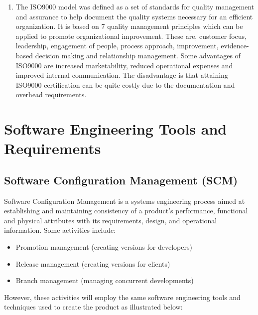 \documentclass{article}
\begin{document}
\begin{enumerate}
    \item The ISO9000 model was defined as a set of standards for quality management and assurance to help document the quality systems necessary for an efficient organization. It is based on 7 quality management principles which can be applied to promote organizational improvement. These are, customer focus, leadership, engagement of people, process approach, improvement, evidence-based decision making and relationship management. Some advantages of ISO9000 are increased marketability, reduced operational expenses and improved internal communication. The disadvantage is that attaining ISO9000 certification can be quite costly due to the documentation and overhead requirements.
   \end{enumerate}
   


\newpage
\section{Software Engineering Tools and Requirements}
\subsection{Software Configuration Management (SCM)}

    Software Configuration Management is a systems engineering process aimed at establishing and maintaining consistency of a product’s performance, functional and physical attributes with its requirements, design, and operational information.\cite{tenbest} Some activities include:
    \begin{itemize}
        \item Promotion management (creating versions for developers)
        \item Release management (creating versions for clients)
        \item Branch management (managing concurrent developments)
    \end{itemize}

    However, these activities will employ the same software engineering tools and techniques used to create the product as illustrated below:\newline
  
\end{document}
